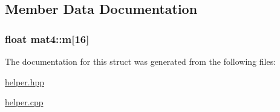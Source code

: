\subsection{Member Data Documentation}
\hypertarget{structmat4_ab424bc8677a83f16bd30f4eaaecb6d3a}{
\subsubsection[{m}]{\setlength{\rightskip}{0pt plus 5cm}float mat4\+::m\mbox{[}16\mbox{]}}}\label{structmat4_ab424bc8677a83f16bd30f4eaaecb6d3a}


The documentation for this struct was generated from the following files\+:\begin{DoxyCompactItemize}
\item 
\hyperlink{helper_8hpp}{helper.\+hpp}\item 
\hyperlink{helper_8cpp}{helper.\+cpp}\end{DoxyCompactItemize}
